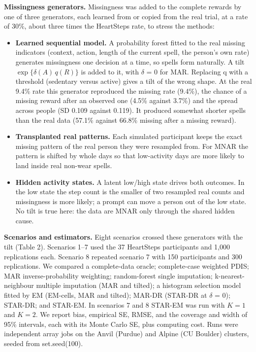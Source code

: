 \documentclass[12pt]{article}
\begin{document}
\textbf{Missingness generators.} Missingness was added to the complete rewards by one of three generators, each learned from or copied from the real trial, at a rate of 30\%, about three times the HeartSteps rate, to stress the methods:

\begin{itemize}

\item \textbf{Learned sequential model.} A probability forest fitted to the real missing indicators (context, action, length of the current spell, the person's own rate) generates missingness one decision at a time, so spells form naturally. A tilt $\exp\{\delta(A)\,q(R)\}$ is added to it, with $\delta$ = 0 for MAR. Replacing q with a threshold (sedentary versus active) gives a tilt of the wrong shape. At the real 9.4\% rate this generator reproduced the missing rate (9.4\%), the chance of a missing reward after an observed one (4.5\% against 3.7\%) and the spread across people (SD 0.109 against 0.119). It produced somewhat shorter spells than the real data (57.1\% against 66.8\% missing after a missing reward).

\item \textbf{Transplanted real patterns.} Each simulated participant keeps the exact missing pattern of the real person they were resampled from. For MNAR the pattern is shifted by whole days so that low-activity days are more likely to land inside real non-wear spells.

\item \textbf{Hidden activity states.} A latent low/high state drives both outcomes. In the low state the step count is the smaller of two resampled real counts and missingness is more likely; a prompt can move a person out of the low state. No tilt is true here: the data are MNAR only through the shared hidden cause.

\end{itemize}

\textbf{Scenarios and estimators.} Eight scenarios crossed these generators with the tilt (Table 2). Scenarios 1--7 used the 37 HeartSteps participants and 1,000 replications each. Scenario 8 repeated scenario 7 with 150 participants and 300 replications. We compared a complete-data oracle; complete-case weighted PDIS; MAR inverse-probability weighting; random-forest single imputation; k-nearest-neighbour multiple imputation (MAR and tilted); a histogram selection model fitted by EM (EM-cells, MAR and tilted); MAR-DR (STAR-DR at $\delta$ = 0); STAR-DR; and STAR-EM. In scenarios 7 and 8 STAR-EM was run with $K=1$ and $K=2$. We report bias, empirical SE, RMSE, and the coverage and width of 95\% intervals, each with its Monte Carlo SE, plus computing cost. Runs were independent array jobs on the Anvil (Purdue) and Alpine (CU Boulder) clusters, seeded from set.seed(100).
\end{document}
